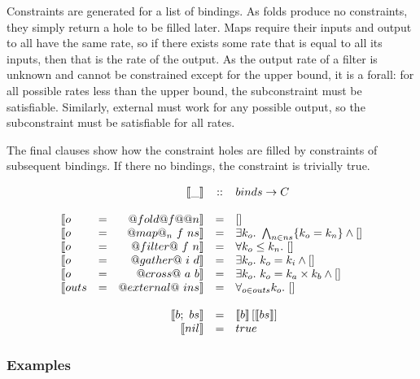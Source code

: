 Constraints are generated for a list of bindings.
As folds produce no constraints, they simply return a hole to be filled later.
Maps require their inputs and output to all have the same rate, so if there exists some rate that is equal to all its inputs, then that is the rate of the output.
As the output rate of a filter is unknown and cannot be constrained except for the upper bound, it is a forall: for all possible rates less than the upper bound, the subconstraint must be satisfiable.
Similarly, external must work for any possible output, so the subconstraint must be satisfiable for all rates.

The final clauses show how the constraint holes are filled by constraints of subsequent bindings.
If there no bindings, the constraint is trivially true.

$$\begin{array}{lcrcl}
&&\constr{\_} & :: & binds \rightarrow C \\
\\

\constr{o &=& @fold @f@ @n}       &  = &  \hole \\
\constr{o &=& @map@_n~f~ns}       &  = &  \exists k_o.\ \bigwedge_{n \in ns}\{k_o = k_n\} \wedge \hole \\
\constr{o &=& @filter@~f~n}       &  = &  \forall k_o \le k_n.\ \hole \\
\constr{o &=& @gather@~i~d}       &  = &  \exists k_o.\ k_o = k_i \wedge \hole \\
\constr{o &=& @cross@~a~b}        &  = &  \exists k_o.\ k_o = k_a \times k_b \wedge \hole \\
\constr{outs &=& @external@~ins}  &  = &  \forall_{o \in outs} k_o.\ \hole \\
\\
&&\constr{b;~bs}  &  = &  \fillhole{\constr{b}}{\constr{bs}}       \\
&&\constr{nil}    &  = &  true                          \\
\end{array}$$

\subsubsection{Examples}


